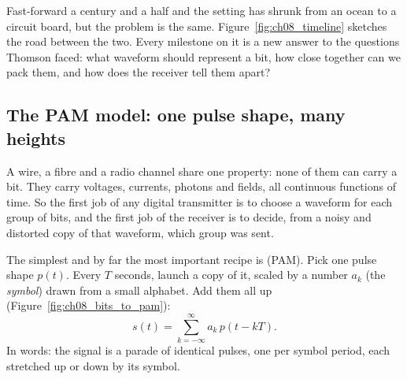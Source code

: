 
Fast-forward a century and a half and the setting has shrunk from an ocean to a circuit
board, but the problem is the same. Figure~\ref{fig:ch08_timeline} sketches the road
between the two. Every milestone on it is a new answer to the questions Thomson faced: what
waveform should represent a bit, how close together can we pack them, and how does the
receiver tell them apart?


\subsection{The PAM model: one pulse shape, many heights}

A wire, a fibre and a radio channel share one property: none of them can carry a bit. They
carry voltages, currents, photons and fields, all continuous functions of time. So the first
job of any digital transmitter is to choose a waveform for each group of bits, and the first
job of the receiver is to decide, from a noisy and distorted copy of that waveform, which
group was sent.

The simplest and by far the most important recipe is  (PAM).
Pick one pulse shape $p(t)$. Every $T$ seconds, launch a copy of it, scaled by a number $a_k$
(the \emph{symbol}) drawn from a small alphabet. Add them all up
(Figure~\ref{fig:ch08_bits_to_pam}):
\begin{equation}
s(t)=\sum_{k=-\infty}^{\infty}a_k\,p(t-kT).
\label{eq:ch08:pam}
\end{equation}
In words: the signal is a parade of identical pulses, one per symbol period, each stretched
up or down by its symbol.


